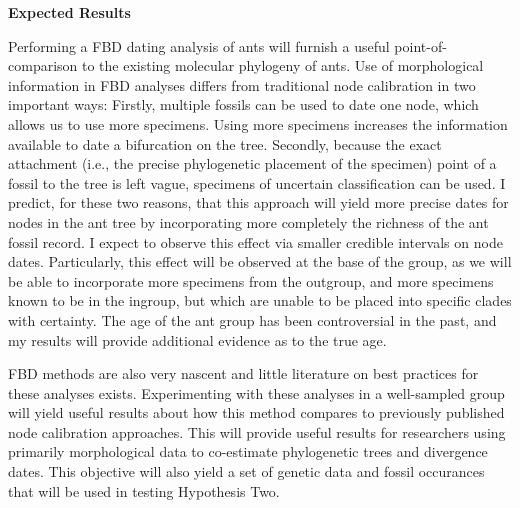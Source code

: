 \documentclass[]{article}
\begin{document}
\textbf{Expected Results} \par
Performing a FBD dating analysis of ants will furnish a useful point-of-comparison to the existing molecular phylogeny of ants.  Use of morphological information in FBD analyses differs from traditional node calibration in two important ways: Firstly, multiple fossils can be used to date one node, which allows us to use more specimens. Using more specimens increases the information available to date a bifurcation on the tree. Secondly, because the exact attachment (i.e., the precise phylogenetic placement of the specimen)  point of a fossil to the tree is left vague, specimens of uncertain classification can be used. I predict, for these two reasons, that this approach will yield more precise dates for nodes in the ant tree by incorporating  more completely the richness of the ant fossil record. I expect to observe this effect via smaller credible intervals on node dates. Particularly, this effect will be observed at the base of the group, as we will be able to incorporate more specimens from the outgroup, and more specimens known to be in the ingroup, but which are unable to be placed into specific clades with certainty. The age of the ant group has been controversial in the past, and my results will provide additional evidence as to the true age. \par
FBD methods are also very nascent and little literature on best practices for these analyses exists. Experimenting with these analyses in a well-sampled group will yield useful results about how this method compares to previously published node calibration approaches. This will provide useful results for researchers using primarily morphological data to co-estimate phylogenetic trees and divergence dates. This objective will also yield a set of genetic data and fossil occurances that will be used in testing Hypothesis Two. \par
\end{document}
